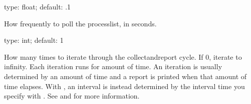 \documentclass[letterpaper,10pt,english]{sphinxmanual}
\begin{document}
\begin{fulllineitems}
\label{\detokenize{mariadb-query-digest:cmdoption-mariadb-query-digest-interval}}
\sphinxAtStartPar
type: float; default: .1

\sphinxAtStartPar
How frequently to poll the processlist, in seconds.

\end{fulllineitems}


\begin{fulllineitems}
\label{\detokenize{mariadb-query-digest:cmdoption-mariadb-query-digest-iterations}}
\sphinxAtStartPar
type: int; default: 1

\sphinxAtStartPar
How many times to iterate through the collect\sphinxhyphen{}and\sphinxhyphen{}report cycle.  If 0, iterate
to infinity.  Each iteration runs for {\hyperref[\detokenize{mariadb-query-digest:cmdoption-mariadb-query-digest-run-time}]{}} amount of time.  An
iteration is usually determined by an amount of time and a report is printed
when that amount of time elapses.  With {\hyperref[\detokenize{mariadb-query-digest:cmdoption-mariadb-query-digest-run-time-mode}]{}} ,
an interval is instead determined by the interval time you specify with
{\hyperref[\detokenize{mariadb-query-digest:cmdoption-mariadb-query-digest-run-time}]{}}.  See {\hyperref[\detokenize{mariadb-query-digest:cmdoption-mariadb-query-digest-run-time}]{}} and {\hyperref[\detokenize{mariadb-query-digest:cmdoption-mariadb-query-digest-run-time-mode}]{}} for more
information.

\end{fulllineitems}
\end{document}
